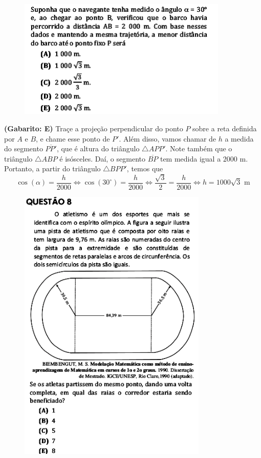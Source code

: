 \documentclass[a4paper]{article}
\begin{document}
\begin{figure}[H]
	\begin{center}
		\includegraphics[width=10cm]{L5Q7_2.png}
	\end{center}
\end{figure}
\par\textbf{(Gabarito: E)} Traçe a projeção perpendicular do ponto $P$ sobre a reta  definida por $A$ e $B$, e chame esse ponto de $P'$. Além disso, vamos chamar de $h$ a medida do segmento $\overline{PP'}$, que é altura do triângulo $\triangle APP'$. Note também que o triângulo $\triangle ABP$ é isósceles. Daí, o segmento $\overline{BP}$ tem medida igual a $2000$ m. Portanto, a partir do triângulo $\triangle BPP'$, temos que
\begin{equation*}
\cos(\alpha) = \frac{h}{2000} \iff \cos(30^\circ) = \frac{h}{2000} \iff \frac{\sqrt{3}}{2} = \frac{h}{2000} \iff h = 1000\sqrt{3}\text{ m}
\end{equation*}
\begin{figure}[H]
	\begin{center}
		\includegraphics[width=9cm]{L5Q8.png}
	\end{center}
\end{figure}
\end{document}
